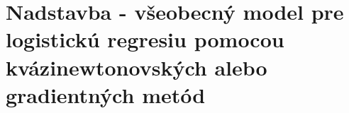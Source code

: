 \documentclass[report.tex]{subfiles}
\begin{document}
	
\section{Nadstavba - všeobecný model pre logistickú regresiu pomocou kvázinewtonovských alebo gradientných metód}\label{sec:H}

	
\end{document}
